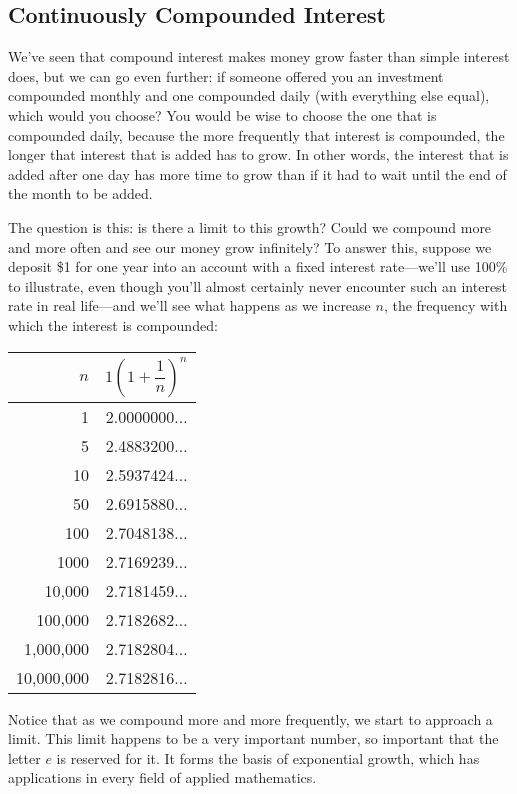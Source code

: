 \subsection{Continuously Compounded Interest}
We've seen that compound interest makes money grow faster than simple interest does, but we can go even further: if someone offered you an investment compounded monthly and one compounded daily (with everything else equal), which would you choose?  You would be wise to choose the one that is compounded daily, because the more frequently that interest is compounded, the longer that interest that is added has to grow.  In other words, the interest that is added after one day has more time to grow than if it had to wait until the end of the month to be added.

The question is this: is there a limit to this growth?  Could we compound more and more often and see our money grow infinitely?  To answer this, suppose we deposit \$1 for one year into an account with a fixed interest rate---we'll use 100\% to illustrate, even though you'll almost certainly never encounter such an interest rate in real life---and we'll see what happens as we increase $n$, the frequency with which the interest is compounded:
\begin{center}
\begin{tabular}{r r}
$n$ & \hspace{0.5in} $1\left(1+\dfrac{1}{n}\right)^n$\\
\hline
1 & 2.0000000$\ldots$\\
5 & 2.4883200$\ldots$\\
10 & 2.5937424$\ldots$\\
50 & 2.6915880$\ldots$\\
100 & 2.7048138$\ldots$\\
1000 & 2.7169239$\ldots$\\
10,000 & 2.7181459$\ldots$\\
100,000 & 2.7182682$\ldots$\\
1,000,000 & 2.7182804$\ldots$\\
10,000,000 & 2.7182816$\ldots$\\
\end{tabular}
\end{center}

Notice that as we compound more and more frequently, we start to approach a limit.  This limit happens to be a very important number, so important that the letter $e$ is reserved for it.  It forms the basis of exponential growth, which has applications in every field of applied mathematics.\\

